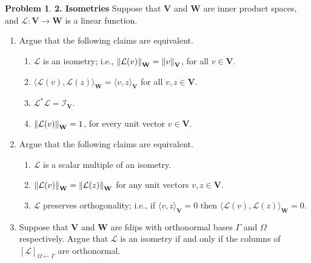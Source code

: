 \documentclass{book}
\theoremstyle{definition}
\newtheorem*{prob*}{Problem}
\newcommand{\V}{\mathbf{V}}
\newcommand{\W}{\mathbf{W}}
\newcommand{\lag}{\mathcal{L}}
\newcommand{\la}{\langle}
\newcommand{\ra}{\rangle}
\begin{document}
\newpage







\begin{prob*}\textbf{2. Isometries} 
	Suppose that $\V$ and $\W$ are inner product spaces, and $\lag: \V \to \W$ is a linear function.
	\begin{enumerate}
		\item Argue that the following claims are equivalent.
		\begin{enumerate}
			\item $\lag$ is an isometry; i.e., $\norm{\lag(v)}_\W = \norm{v}_\V$, for all $v\in \V$.
			\item $\la \lag(v), \lag(z)\ra_\W = \la v,z \ra_\V$ for all $v,z\in \V$.
			\item $\lag^*\lag = \mathcal{I}_\V$.
			\item $\norm{\lag(v)}_\W = 1$, for every unit vector $v\in \V$.
		\end{enumerate}
	
	
	
		\item Argue that the following claims are equivalent.
		\begin{enumerate}
			\item $\lag$ is a scalar multiple of an isometry.
			\item $\norm{\lag(v)}_\W = \norm{\lag(z)}_\W$ for any unit vectors $v,z\in \V$.
			\item $\lag$ preserves orthogonality; i.e., if $\la v,z\ra_\V = 0$ then $\la \lag(v), \lag(z)\ra_\W = 0$.
		\end{enumerate}
	
	
	
		\item Suppose that $\V$ and $\W$ are fdips with orthonormal bases $\Gamma$ and $\Omega$ respectively. Argue that $\lag$ is an isometry if and only if the columns of $[\lag]_{\Omega\leftarrow\Gamma}$ are orthonormal.
	\end{enumerate}
	
\end{prob*}









\newpage
\end{document}
